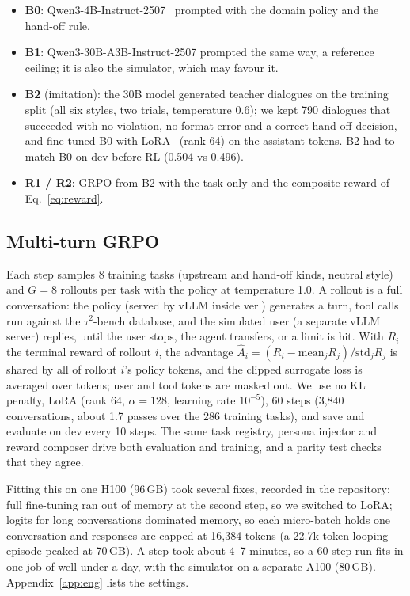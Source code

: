 \documentclass[12pt,a4paper]{article}
\newcommand{\tautwo}{$\tau^2$-bench}
\begin{document}
\begin{itemize}
\item \textbf{B0}: Qwen3-4B-Instruct-2507~\cite{yang2025} prompted with the
domain policy and the hand-off rule.
\item \textbf{B1}: Qwen3-30B-A3B-Instruct-2507 prompted the same way, a
reference ceiling; it is also the simulator, which may favour it.
\item \textbf{B2} (imitation): the 30B model generated teacher dialogues on
the training split (all six styles, two trials, temperature 0.6); we kept 790
dialogues that succeeded with no violation, no format error and a correct
hand-off decision, and fine-tuned B0 with LoRA~\cite{hu2022} (rank 64) on the
assistant tokens. B2 had to match B0 on dev before RL (0.504 vs 0.496).
\item \textbf{R1 / R2}: GRPO from B2 with the task-only and the composite
reward of Eq.~\eqref{eq:reward}.
\end{itemize}

\subsection{Multi-turn GRPO}

Each step samples 8 training tasks (upstream and hand-off kinds, neutral
style) and $G{=}8$ rollouts per task with the policy at temperature 1.0. A
rollout is a full conversation: the policy (served by vLLM inside verl)
generates a turn, tool calls run against the \tautwo{} database, and the
simulated user (a separate vLLM server) replies, until the user stops, the
agent transfers, or a limit is hit. With $R_i$ the terminal reward of rollout
$i$, the advantage $\hat A_i=(R_i-\mathrm{mean}_j R_j)/\mathrm{std}_j R_j$ is
shared by all of rollout $i$'s policy tokens, and the clipped surrogate loss
is averaged over tokens; user and tool tokens are masked out. We use no KL
penalty, LoRA (rank 64, $\alpha{=}128$, learning rate $10^{-5}$), 60 steps
(3,840 conversations, about 1.7 passes over the 286 training tasks), and save
and evaluate on dev every 10 steps. The same task registry, persona injector
and reward composer drive both evaluation and training, and a parity test
checks that they agree.

Fitting this on one H100 (96\,GB) took several fixes, recorded in the
repository: full fine-tuning ran out of memory at the second step, so we
switched to LoRA; logits for long conversations dominated memory, so each
micro-batch holds one conversation and responses are capped at 16,384 tokens
(a 22.7k-token looping episode peaked at 70\,GB). A step took about 4--7
minutes, so a 60-step run fits in one job of well under a day, with the
simulator on a separate A100 (80\,GB). Appendix~\ref{app:eng} lists the settings.
\end{document}
